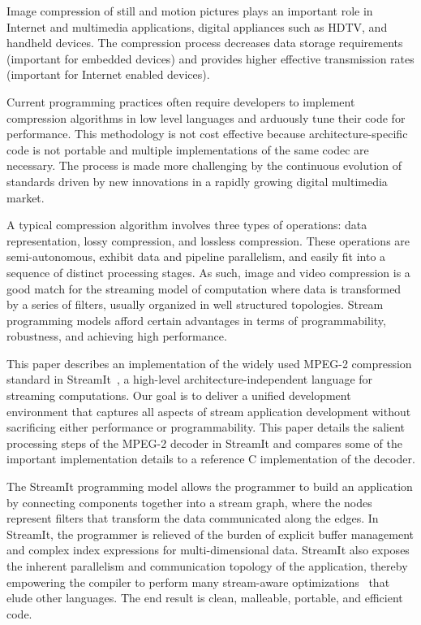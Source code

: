 
Image compression of still and motion pictures plays an important role
in Internet and multimedia applications, digital appliances such as
HDTV, and handheld devices. The compression process decreases data storage
requirements (important for embedded devices) and provides higher
effective transmission rates (important for Internet enabled devices).

Current programming practices often require developers to implement
compression algorithms in low level languages and arduously
tune their code for performance. This methodology is not cost
effective because architecture-specific code is not portable and 
multiple implementations of the same codec are necessary. 
The process is made more challenging by the continuous evolution
of standards driven by new innovations in a rapidly growing 
digital multimedia market.

A typical compression algorithm involves three types of operations:
data representation, lossy compression, and lossless
compression. These operations are semi-autonomous, exhibit data and
pipeline parallelism, and easily fit into a sequence of distinct
processing stages. As such, image and video compression is a good
match for the streaming model of computation where data is transformed
by a series of filters, usually organized in well structured
topologies.  Stream programming models afford certain advantages in
terms of programmability, robustness, and achieving high performance.

This paper describes an implementation of the widely used MPEG-2
compression standard in StreamIt~\cite{streamitcc}, a high-level
architecture-independent language for streaming computations. Our goal
is to deliver a unified development environment that captures all
aspects of stream application development without sacrificing either
performance or programmability. This paper details the salient
processing steps of the MPEG-2 decoder in StreamIt and compares some
of the important implementation details to a reference C
implementation of the decoder.

The StreamIt programming model allows the programmer to build an
application by connecting components together into a stream graph,
where the nodes represent filters that transform the data communicated
along the edges. In StreamIt, the programmer is relieved of the burden
of explicit buffer management and complex index expressions for
multi-dimensional data.  StreamIt also exposes the inherent
parallelism and communication topology of the application, thereby
empowering the compiler to perform many stream-aware
optimizations~\cite{agrawal05cases,gordon02asplos,lamb03pldi,sermulins05lctes}
that elude other languages. The end result is clean, malleable, portable, and efficient code.
